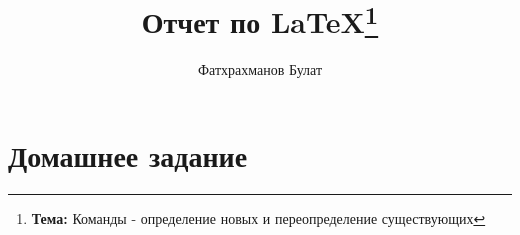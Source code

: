 \documentclass{report}
\author{Фатхрахманов Булат}
\title{Отчет по \LaTeX \thanks{{\bf Тема:} Команды - определение новых и переопределение существующих}}
\begin{document}
	\maketitle
	\tableofcontents
	\newpage
	
	
	
	\chapter{Домашнее задание}
\end{document}
